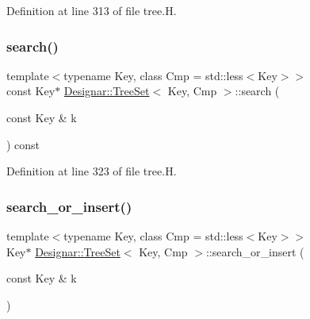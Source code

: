 Definition at line 313 of file tree.\+H.

\mbox{\label{class_designar_1_1_tree_set_a6b8bce7908110a0ade8ca556191d29be}} 
\subsubsection{\texorpdfstring{search()}{search()}\hspace{0.1cm}{\footnotesize\ttfamily [2/2]}}
{\footnotesize\ttfamily template$<$typename Key, class Cmp = std\+::less$<$\+Key$>$$>$ \\
const Key$\ast$ \hyperlink{class_designar_1_1_tree_set}{Designar\+::\+Tree\+Set}$<$ Key, Cmp $>$\+::search (\begin{DoxyParamCaption}\item[{const Key \&}]{k }\end{DoxyParamCaption}) const\hspace{0.3cm}{\ttfamily [inline]}}



Definition at line 323 of file tree.\+H.

\mbox{\label{class_designar_1_1_tree_set_a0864bfc148a71b4ea0877d07d4924cd0}} 
\subsubsection{\texorpdfstring{search\+\_\+or\+\_\+insert()}{search\_or\_insert()}\hspace{0.1cm}{\footnotesize\ttfamily [1/2]}}
{\footnotesize\ttfamily template$<$typename Key, class Cmp = std\+::less$<$\+Key$>$$>$ \\
Key$\ast$ \hyperlink{class_designar_1_1_tree_set}{Designar\+::\+Tree\+Set}$<$ Key, Cmp $>$\+::search\+\_\+or\+\_\+insert (\begin{DoxyParamCaption}\item[{const Key \&}]{k }\end{DoxyParamCaption})\hspace{0.3cm}{\ttfamily [inline]}}



